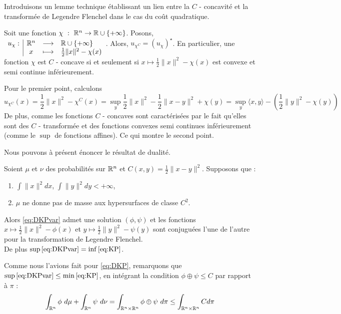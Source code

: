 \documentclass[a4paper,12pt]{article}
\begin{document}
\vspace{0.3cm}
Introduisons un lemme technique établissant un lien entre la $C$ - concavité et la transformée de Legendre Flenchel dans le cas du coût quadratique. 

\begin{lemme}
Soit une fonction $\chi\ :\ \mathbb{R}^n \rightarrow \mathbb{R}\cup\{+\infty\}$. Posons, $\begin{array}[t]{l|ccl} u_{\chi}: & \mathbb{R}^n & \longrightarrow & \mathbb{R}\cup\{+\infty\} \\ & x & \longmapsto & \frac{1}{2}\|x\|^2-\chi(x) \end{array} $. Alors, $u_{\chi^C} = (u_{\chi})^{\star}$. En particulier, une fonction $\chi$ est $C$ - concave si et seulement si $x\mapsto\frac{1}{2}\|x\|^2-\chi(x)$ est convexe et semi continue inférieurement. 
\end{lemme}
\begin{preuve}
Pour le premier point, calculons 
$$
u_{\chi^C}(x) =\frac{1}{2}\|x\|^2 - \chi^C(x)=\sup_y \frac{1}{2}\|x\|^2  - \frac{1}{2}\|x - y\|^2 + \chi(y) = \sup_y \langle x,y\rangle - \left( \frac{1}{2}\|y\|^2 - \chi(y)\right) 
$$
De plus, comme les fonctions $C$ - concaves sont caractérisées par le fait qu'elles sont des $C$ - transformée et des fonctions convexes semi continues inférieurement (comme le $\sup$ de fonctions affines). Ce qui montre le second point.
\end{preuve}
Nous pouvons à présent énoncer le résultat de dualité. 
\begin{theoreme}{}
Soient $\mu$ et $\nu$ des probabilités sur $\mathbb{R}^n$ et $C(x,y)=\frac{1}{2}\|x-y\|^2$. Supposons que : 
\begin{enumerate}
\item $\int\|x\|^2dx$, $\int\|y\|^2dy<+\infty$,
\item $\mu$ ne donne pas de masse aux hypersurfaces de classe $C^2$.
\end{enumerate}
Alors \eqref{eq:DKPvar} admet une solution $(\phi,\psi)$ et les fonctions $x\mapsto\frac{1}{2}\|x\|^2-\phi(x)$ et $y\mapsto\frac{1}{2}\|y\|^2-\psi(y)$ sont conjuguées l'une de l'autre pour la transformation de Legendre Flenchel.\\
De plus $\sup\eqref{eq:DKPvar}=\inf\eqref{eq:KP}$. 
\end{theoreme}
Comme nous l'avions fait pour \eqref{eq:DKP}, remarquons que $\sup\eqref{eq:DKPvar}\leq \min\eqref{eq:KP}$, en intégrant la condition $\phi\oplus\psi\leq C$ par rapport à $\pi$ : 
$$
\int_{\mathbb{R}^n}\phi\ d\mu + \int_{\mathbb{R}^n}\psi\ d\nu = \int_{\mathbb{R}^n\times\mathbb{R}^n} \phi\oplus\psi\ d\pi \leq\int_{\mathbb{R}^n\times\mathbb{R}^n} C d\pi 
$$
\end{document}
